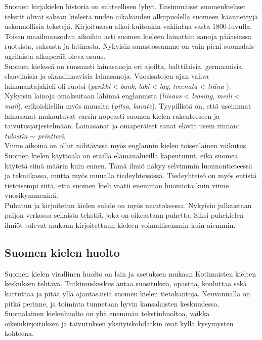 \begin{multicols}{2}
Suomen kirjakielen historia on suhteellisen lyhyt. Ensimmäiset suomenkieliset
tekstit olivat saksan kielestä uuden aikakauden alkupuolella suomeen
käännettyjä uskonnollisia tekstejä. Kirjoitusasu alkoi kuitenkin vakiintua
vasta 1800-luvulla. Toisen maailmansodan aikoihin asti suomen kieleen lainattiin
sanoja pääasiassa ruotsista, saksasta ja latinasta. Nykyisin sanastossamme on
vain pieni suomalais-ugrilaista alkuperää oleva osuus.\\
Suomen kielessä on runsaasti lainasanoja eri ajoilta, balttilaisia,
germaanisia, slaavilaisia ja skandinaavisia lainasanoja. Vuosisatojen
ajan vahva lainanantajakieli oli ruotsi (\textit{pankki} <
\textit{bank}, \textit{laki} < \textit{lag}, \textit{treenata} <
\textit{träna} ). Nykyisin lainoja omaksutaan lähinnä englannista
(\textit{liisaus} < \textit{leasing}, \textit{meili} < \textit{mail}),
erikoiskieliin myös muualta (\textit{pitsa},
\textit{karate}). Tyypillistä on, että useimmat lainasanat mukautuvat
varsin nopeasti suomen kielen rakenteeseen ja
taivutusjärjestelmään. Lainasanat ja omaperäiset sanat elävät usein
rinnan: \textit{tulostin} $\sim$ \textit{printteri}.\\
Viime aikoina on ollut nähtävissä myös englannin kielen toisenlainen vaikutus.
Suomen kielen käyttöala on eräillä elämänalueilla kapeutunut, eikä suomea
käytetä siinä määrin kuin ennen. Tämä ilmiö näkyy selvimmin luonnontieteessä ja
tekniikassa, mutta myös muualla tiedeyhteisössä. Tiedeyhteisö on myös entistä
tietoisempi siitä, että suomen kieli vaatii enemmän huomiota kuin viime
vuosikymmeninä.\\
Puhutun ja kirjoitetun kielen suhde on myös muutoksessa. Nykyisin julkaistaan
paljon verkossa sellaista tekstiä, joka on oikeastaan puhetta. Siksi puhekielen
ilmiöt tulevat mukaan kirjoitettuun kieleen voimallisemmin kuin aiemmin.

\subsection{Suomen kielen huolto}

Suomen kielen virallinen huolto on lain ja asetuksen mukaan Kotimaisten kielten
keskuksen tehtävä. Tutkimuskeskus antaa suosituksia, opastaa, kouluttaa
sekä kartuttaa ja pitää yllä ajantasaisia suomen kielen tietokantoja.
Neuvonnalla on pitkä perinne, ja toiminta tunnetaan hyvin kansalaisten
keskuudessa. Suomalainen kielenhuolto on yhä enemmän tekstinhuoltoa, vaikka
oikeinkirjoituksen ja taivutuksen yksityiskohdatkin ovat kyllä kysymysten
kohteena.


\end{multicols}
